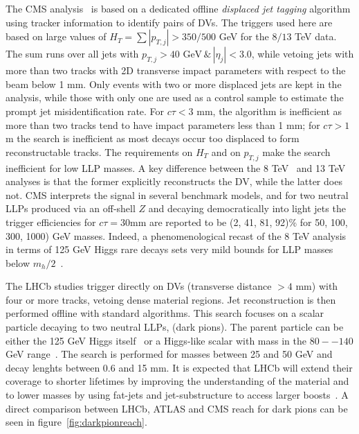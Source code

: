 The CMS analysis~\cite{Aad:2015rba,CMS:2017oor} is based on a dedicated offline \emph{displaced jet tagging} algorithm using tracker information to identify pairs of DVs. The triggers used here are based on large values of $H_T =  \sum | p_{T,j} |  > 350 / 500 $ GeV for the $8 / 13$ TeV data. The sum runs over all jets with $p_{T,j}> 40 \mbox{ GeV}\,\&\, |\eta_j| < 3.0$, while vetoing jets with more than two tracks with 2D transverse impact parameters with respect to the beam below 1 mm. Only events with two or more displaced jets are kept in the analysis, while those with only one are used as a control sample to estimate the prompt jet misidentification rate. For $c \tau < 3$ mm, the algorithm is inefficient as more than two tracks tend to have impact parameters less than 1 mm; for $c \tau > 1$ m the search is inefficient as most decays occur too displaced to form reconstructable tracks. The requirements on $H_T$ and on $p_{T,j}$ make the search inefficient for low LLP masses. A key difference between the 8 TeV~\cite{Khachatryan:2015wka} and 13 TeV~\cite{CMS:2017oor} analyses is that the former explicitly reconstructs the DV, while the latter does not. CMS interprets the signal in several benchmark models, and for two neutral LLPs produced via an  off-shell $Z$ and decaying democratically into light jets the trigger efficiencies for $c \tau= 30 $mm are reported to be (2, 41, 81, 92)\% for 50, 100, 300, 1000) GeV masses. Indeed, a phenomenological recast of the 8 TeV analysis~\cite{CMS:2014wda} in terms of 125 GeV Higgs rare decays sets very mild bounds for LLP masses below $m_h / 2$~\cite{Csaki:2015fba}. 

The LHCb studies \cite{Aaij:2016isa,Aaij:2017mic} trigger directly on DVs (transverse distance $> 4$ mm) with four or more tracks, vetoing dense material regions.  Jet reconstruction is then performed offline with standard algorithms.  This search focuses on a scalar particle decaying to two neutral LLPs, \piv (dark pions).  The parent particle can be either the 125 GeV Higgs itself~\cite{Aaij:2017mic} or a Higgs-like scalar with mass in the $80 -- 140$ GeV range~\cite{Aaij:2016isa}.  The search is performed for \piv masses between 25 and 50 GeV and decay lenghts between 0.6 and 15 mm. It is expected that LHCb will extend their coverage to shorter lifetimes by improving the understanding of the material and to lower masses by using fat-jets and jet-substructure to access larger boosts~\cite{Vaszquez:2017workshop}. A direct comparison between LHCb, ATLAS and CMS reach for dark pions can be seen in figure~\ref{fig:darkpionreach}. 

